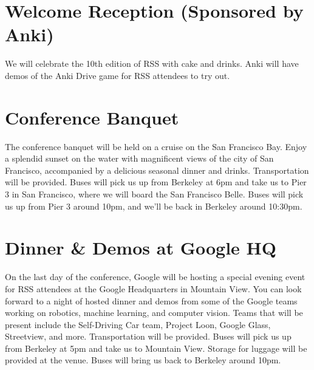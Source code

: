 \section*{Welcome Reception (Sponsored by Anki)}

We will celebrate the 10th edition of RSS with cake and drinks. Anki will have demos of the Anki Drive game for RSS attendees to try out.

\vspace{3mm}
\section*{Conference Banquet}
The conference banquet will be held on a cruise on the San Francisco Bay. Enjoy a splendid sunset on the water with magnificent views of the city of San Francisco, accompanied by a delicious seasonal dinner and drinks. Transportation will be provided. Buses will pick us up from Berkeley at 6pm and take us to Pier 3 in San Francisco, where we will board the San Francisco Belle. Buses will pick us up from Pier 3 around 10pm, and we'll be back in Berkeley around 10:30pm.

\vspace{3mm}
\section*{Dinner \& Demos at Google HQ}
On the last day of the conference, Google will be hosting a special evening event for RSS attendees at the Google Headquarters in Mountain View. You can look forward to a night of hosted dinner and demos from some of the Google teams working on robotics, machine learning, and computer vision. Teams that will be present include the Self-Driving Car team, Project Loon, Google Glass, Streetview, and more. Transportation will be provided. Buses will pick us up from Berkeley at 5pm and take us to Mountain View. Storage for luggage will be provided at the venue. Buses will bring us back to Berkeley around 10pm.


\setlength\fboxrule{0pt}


